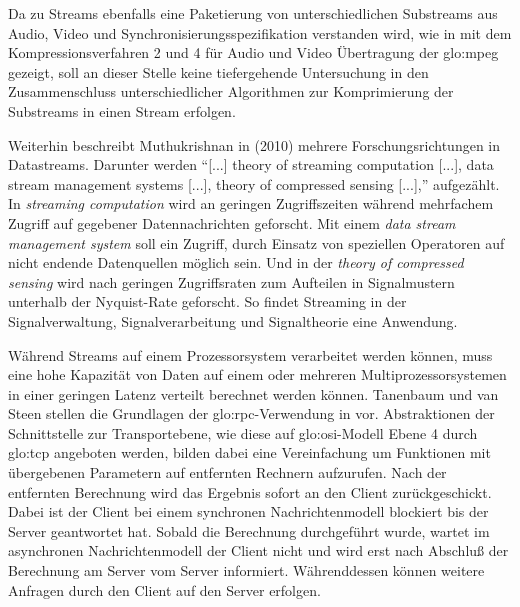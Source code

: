 Da zu Streams ebenfalls eine Paketierung von unterschiedlichen Substreams aus Audio, Video und Synchronisierungsspezifikation verstanden wird, wie in  mit dem Kompressionsverfahren 2 und 4 für Audio und Video Übertragung der \gls{glo:mpeg} gezeigt, soll an dieser Stelle keine tiefergehende Untersuchung in den Zusammenschluss unterschiedlicher Algorithmen zur Komprimierung der Substreams in einen Stream erfolgen. 

Weiterhin beschreibt Muthukrishnan in  (2010) mehrere Forschungsrichtungen in Datastreams. Darunter werden "`[...] theory of streaming computation [...], data stream management systems [...], theory of compressed sensing [...],"'   aufgezählt. In \textit{streaming computation} wird an geringen Zugriffszeiten während mehrfachem Zugriff auf gegebener Datennachrichten geforscht. 
Mit einem \textit{data stream management system} soll ein Zugriff, durch Einsatz von speziellen Operatoren auf nicht endende Datenquellen möglich sein. Und in der \textit{theory of compressed sensing} wird nach geringen Zugriffsraten zum Aufteilen in Signalmustern unterhalb der Nyquist-Rate geforscht. So findet Streaming in der Signalverwaltung, Signalverarbeitung und Signaltheorie eine Anwendung.


Während Streams auf einem Prozessorsystem verarbeitet werden können, muss eine hohe Kapazität von Daten auf einem oder mehreren Multiprozessorsystemen in einer geringen Latenz verteilt berechnet werden können. Tanenbaum und van Steen stellen die Grundlagen der \gls{glo:rpc}-Verwendung in  vor. Abstraktionen der Schnittstelle zur Transportebene, wie diese auf \acrshort{glo:osi}-Modell Ebene 4 durch \gls{glo:tcp} angeboten werden, bilden dabei eine Vereinfachung um Funktionen mit übergebenen Parametern auf entfernten Rechnern aufzurufen. Nach der entfernten Berechnung wird das Ergebnis sofort an den Client zurückgeschickt. Dabei ist der Client bei einem synchronen Nachrichtenmodell blockiert bis der Server geantwortet hat. Sobald die Berechnung durchgeführt wurde, wartet im asynchronen Nachrichtenmodell der Client nicht und wird erst nach Abschluß der Berechnung am Server vom Server informiert. Währenddessen können weitere Anfragen durch den Client auf den Server erfolgen. 

